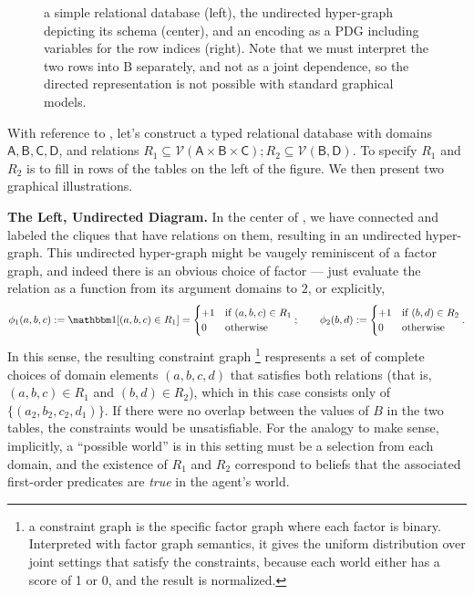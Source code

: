 \documentclass{article}
\theoremstyle{definition}
\theoremstyle{remark}
\newcommand{\var}[1]{\mathsf{#1}}
\begin{document}
\begin{figure}
    
    \caption{a simple relational database (left), the undirected hyper-graph depicting its schema (center), and an encoding as a PDG including variables for the row indices (right). Note that we must interpret the two rows into B separately, and not as a joint dependence, so the directed representation is not possible with standard graphical models.} \label{fig:sketches}
\end{figure}
\begin{example}
    With reference to , let's construct a typed relational database with domains $\var{A, B, C, D}$, and relations $R_1 \subseteq \mathcal V(\var{A\times B \times C}); R_2 \subseteq \mathcal V(\var{B, D})$. To specify $R_1$ and $R_2$ is to fill in rows of the tables on the left of the figure. We then present two graphical illustrations.
    
    \textbf{The Left, Undirected Diagram.} In the center of , we have connected and labeled the cliques that have relations on them, resulting in an undirected hyper-graph. This undirected hyper-graph might be vaugely reminiscent of a factor graph, and indeed there is an obvious choice of factor --- just evaluate the relation as a function from its argument domains to $2$, or explicitly,
     \[ \phi_1(a,b,c) := \mathbbm1[(a,b,c) \in R_1]=  \begin{cases}
         +1 & \text{if } (a,b,c) \in R_1 \\ 0 & \text{otherwise}
     \end{cases};\qquad 
     \phi_2(b,d) := \begin{cases}
         +1 & \text{if } (b,d) \in R_2 \\ 0 & \text{otherwise}
     \end{cases}.\]
    In this sense, the resulting constraint graph%
        \footnote{a constraint graph is the specific factor graph where each factor is binary.
            Interpreted with factor graph semantics, it gives the uniform distribution over joint settings that satisfy the constraints, because each world either has a score of 1 or 0, and the result is normalized.}
    respresents a set of complete choices of domain elements $(a,b,c,d)$ that satisfies both relations (that is, $(a,b,c) \in R_1$ and $(b,d) \in R_2$), which in this case consists only of $\{(a_2,b_2, c_2,d_1)\}$. If there were no overlap between the values of $B$ in the two tables, the constraints would be unsatisfiable. For the analogy to make sense, implicitly, a ``possible world'' is in this setting must be a selection from each domain, and the existence of $R_1$ and $R_2$ correspond to beliefs that the associated first-order predicates are \emph{true} in the agent's world.
    

\end{example}
\end{document}
